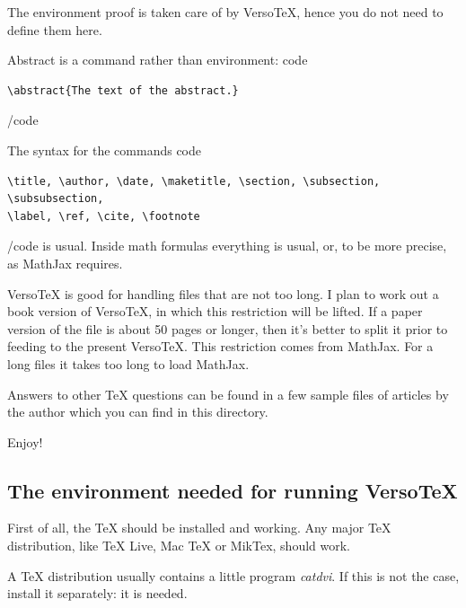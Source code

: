 \documentclass{article}
\begin{document}
The environment proof is taken care of by VersoTeX, 
hence you do not need to define them here.

Abstract is a command rather than environment:\newline
\<code\>
\begin{verbatim} 
\abstract{The text of the abstract.}
\end{verbatim} 
\</code\>

The syntax for the commands 
\<code\>
\begin{verbatim}
\title, \author, \date, \maketitle, \section, \subsection, \subsubsection,
\label, \ref, \cite, \footnote 
\end{verbatim}
\</code\>
is usual. Inside math formulas everything is usual, or, to be more 
precise, as MathJax requires.

VersoTeX is good for handling files that are not too long. 
 I plan to work out a book version of
VersoTeX, in which this restriction will be lifted.
If a paper version of the file is about 50 pages or longer, 
then it's better to split it prior to feeding to the present VersoTeX.   
This restriction comes from MathJax. For a long files it takes too 
long to load MathJax. 



Answers to other TeX questions can be found in a few sample files
of articles by the author which you can find in this directory.   

Enjoy!

\subsection{The environment needed for running VersoTeX}\label{s2.2}
First of all, the TeX should be installed and working. Any major TeX
distribution, like TeX Live, Mac TeX or MikTex, should work. 

A TeX distribution usually contains a little program {\em catdvi\/}.
If this is not the case, install it separately: it is needed.
\end{document}
